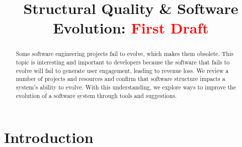\documentclass[12pt,conference]{IEEEtran}
\newcommand\todo[1]{\textcolor{red}{#1}}
\begin{document}
\pagestyle{plain}

\title{Structural Quality \& Software Evolution: \newline \todo{First Draft}}

\author{
}

\maketitle

\begin{abstract}

Some software engineering projects fail to evolve, which makes them obsolete.
This topic is interesting and important to developers because the software that fails to evolve will fail to generate user engagement, leading to revenue loss.
We review a number of projects and resources and confirm that software structure impacts a system's ability to evolve.
With this understanding, we explore ways to improve the evolution of a software system through tools and suggestions.

\end{abstract}


\vspace{0.5cm}
\section{Introduction}
\vspace{0.25cm}
\end{document}
